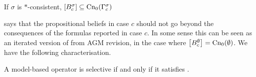 \begin{axiom}[\boundedness{}]
    If $\sigma$ is $\ast$-consistent, $\left[{B^\sigma_c}\right]
    \subseteq \operatorname{Cn}_0(\Gamma^\sigma_c)$
\end{axiom}

\boundedness{} says that the propositional beliefs in case $c$ should not go
beyond the consequences of the formulas reported in case $c$. In some sense
this can be seen as an iterated version of  from AGM
revision, in the case where $\left[{B^\emptyset_c}\right] = \operatorname{Cn}_0(\emptyset)$. We
have the following characterisation.

\begin{theorem}
    \label{kr_thm_selectivity_characterisation}
    A model-based operator is selective if and only if it satisfies
    \boundedness{}.
\end{theorem}

